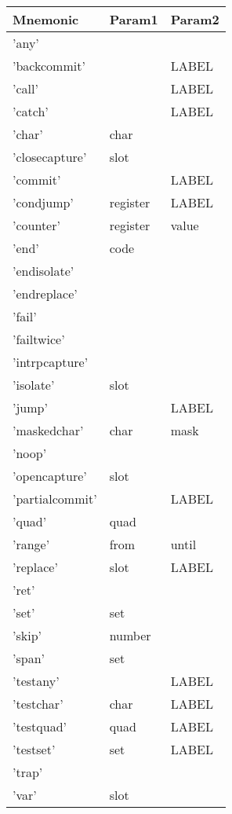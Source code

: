 
\begin{center}
\label{tab:naig_assembly}
\begin{longtable}{lll}
\textbf{Mnemonic} & \textbf{Param1} & \textbf{Param2} \\
\endhead
'any' &  &  \\
'backcommit' &  & LABEL \\
'call' &  & LABEL \\
'catch' &  & LABEL \\
'char' & char &  \\
'closecapture' & slot &  \\
'commit' &  & LABEL \\
'condjump' & register & LABEL \\
'counter' & register & value \\
'end' & code &  \\
'endisolate' &  &  \\
'endreplace' &  &  \\
'fail' &  &  \\
'failtwice' &  &  \\
'intrpcapture' &  &  \\
'isolate' & slot &  \\
'jump' &  & LABEL \\
'maskedchar' & char & mask \\
'noop' &  &  \\
'opencapture' & slot &  \\
'partialcommit' &  & LABEL \\
'quad' & quad &  \\
'range' & from & until \\
'replace' & slot & LABEL \\
'ret' &  &  \\
'set' & set &  \\
'skip' & number &  \\
'span' & set &  \\
'testany' &  & LABEL \\
'testchar' & char & LABEL \\
'testquad' & quad & LABEL \\
'testset' & set & LABEL \\
'trap' &  &  \\
'var' & slot &  \\
\end{longtable}
\end{center}
